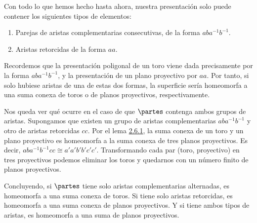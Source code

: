 {    \noindent
    Con todo lo que hemos hecho hasta ahora, nuestra presentación solo puede contener los siguientes tipos de elementos:

    \begin{enumerate}
        \item Parejas de aristas complementarias consecutivas, de la forma $aba^{-1}b^{-1}$.
        \item Aristas retorcidas de la forma $aa$.
    \end{enumerate}

    \noindent
    Recordemos que la presentación poligonal de un toro viene dada precisamente por la forma $a b a^{-1} b^{-1}$, 
    y la presentación de un plano proyectivo por $aa$. 
    Por tanto, si solo hubiese aristas de una de estas dos formas, 
    la superficie sería homeomorfa a una suma conexa de toros o de planos proyectivos, respectivamente.

    \vspace{0.5em}
    \noindent
    Nos queda ver qué ocurre en el caso de que $\partes$ contenga ambos grupos de aristas. 
    Supongamos que existen un grupo de aristas complementarias $aba^{-1}b^{-1}$ y otro de aristas retorcidas $cc$. 
    Por el lema \hyperref[lem:toro-proyectivo]{2.6.1}, la suma conexa de un toro y un plano proyectivo es homeomorfa a la suma conexa de tres planos proyectivos. 
    Es decir, $aba^{-1}b^{-1}cc \cong a'a'b'b'c'c'$. 
    Transformando cada par (toro, proyectivo) en tres proyectivos podemos eliminar los toros y quedarnos con un número finito de planos proyectivos.

    \vspace{0.5em}
    \noindent
    Concluyendo, si $\partes$ tiene solo aristas complementarias alternadas, es homeomorfa a una suma conexa de toros. 
    Si tiene solo aristas retorcidas, es homeomorfa a una suma conexa de planos proyectivos. 
    Y si tiene ambos tipos de aristas, es homeomorfa a una suma de planos proyectivos.
}


